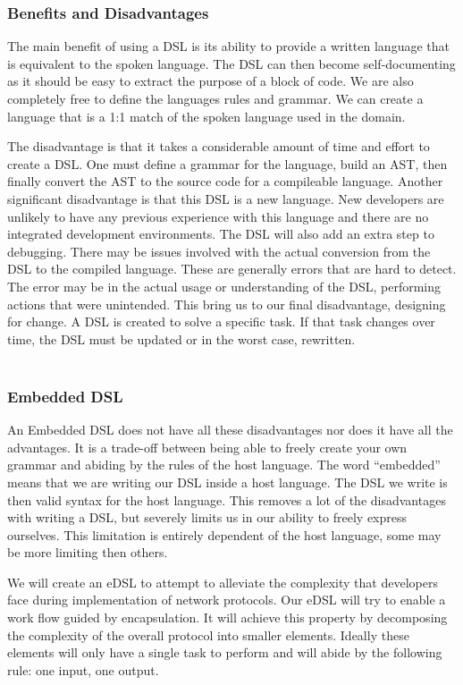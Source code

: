 \subsubsection{Benefits and Disadvantages}
The main benefit of using a DSL is its ability to provide a written language that is equivalent to the spoken language. The DSL can then become self-documenting as it should be easy to extract the purpose of a block of code. We are also completely free to define the languages rules and grammar. We can create a language that is a 1:1 match of the spoken language used in the domain.

The disadvantage is that it takes a considerable amount of time and effort to create a DSL. One must define a grammar for the language, build an AST, then finally convert the AST to the source code for a compileable language. Another significant disadvantage is that this DSL is a new language. New developers are unlikely to have any previous experience with this language and there are no integrated development environments. The DSL will also add an extra step to debugging. There may be issues involved with the actual conversion from the DSL to the compiled language. These are generally errors that are hard to detect. The error may be in the actual usage or understanding of the DSL, performing actions that were unintended. This bring us to our final disadvantage, designing for change. A DSL is created to solve a specific task. If that task changes over time, the DSL must be updated or in the worst case, rewritten. 
\\\\
\subsubsection{Embedded DSL}
An Embedded DSL does not have all these disadvantages nor does it have all the advantages. It is a trade-off between being able to freely create your own grammar and abiding by the rules of the host language. The word ``embedded'' means that we are writing our DSL inside a host language. The DSL we write is then valid syntax for the host language. This removes a lot of the disadvantages with writing a DSL, but severely limits us in our ability to freely express ourselves. This limitation is entirely dependent of the host language, some may be more limiting then others.

We will create an eDSL to attempt to alleviate the complexity that developers face during implementation of network protocols. Our eDSL will try to enable a work flow guided by encapsulation. It will achieve this property by decomposing the complexity of the overall protocol into smaller elements. Ideally these elements will only have a single task to perform and will abide by the following rule: one input, one output. 


